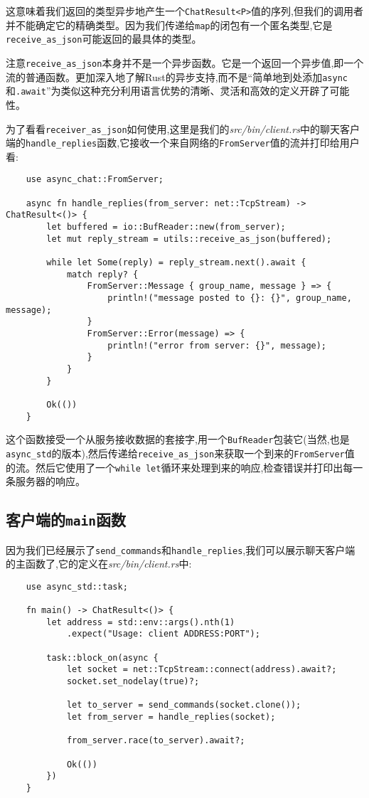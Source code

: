 这意味着我们返回的类型异步地产生一个\texttt{ChatResult<P>}值的序列,但我们的调用者并不能确定它的精确类型。因为我们传递给\texttt{map}的闭包有一个匿名类型,它是\texttt{receive\_as\_json}可能返回的最具体的类型。

注意\texttt{receive\_as\_json}本身并不是一个异步函数。它是一个返回一个异步值,即一个流的普通函数。更加深入地了解Rust的异步支持,而不是“简单地到处添加\texttt{async}和\texttt{.await}”为类似这种充分利用语言优势的清晰、灵活和高效的定义开辟了可能性。 

为了看看\texttt{receiver\_as\_json}如何使用,这里是我们的\emph{src/bin/client.rs}中的聊天客户端的\texttt{handle\_replies}函数,它接收一个来自网络的\texttt{FromServer}值的流并打印给用户看:
\begin{verbatim}
    use async_chat::FromServer;

    async fn handle_replies(from_server: net::TcpStream) -> ChatResult<()> {
        let buffered = io::BufReader::new(from_server);
        let mut reply_stream = utils::receive_as_json(buffered);

        while let Some(reply) = reply_stream.next().await {
            match reply? {
                FromServer::Message { group_name, message } => {
                    println!("message posted to {}: {}", group_name, message);
                }
                FromServer::Error(message) => {
                    println!("error from server: {}", message);
                }
            }
        }

        Ok(())
    }
\end{verbatim}

这个函数接受一个从服务接收数据的套接字,用一个\texttt{BufReader}包装它(当然,也是\texttt{async\_std}的版本),然后传递给\texttt{receive\_as\_json}来获取一个到来的\texttt{FromServer}值的流。然后它使用了一个\texttt{while let}循环来处理到来的响应,检查错误并打印出每一条服务器的响应。

\subsection{客户端的\texttt{main}函数}
因为我们已经展示了\texttt{send\_commands}和\texttt{handle\_replies},我们可以展示聊天客户端的主函数了,它的定义在\emph{src/bin/client.rs}中:
\begin{verbatim}
    use async_std::task;

    fn main() -> ChatResult<()> {
        let address = std::env::args().nth(1)
            .expect("Usage: client ADDRESS:PORT");

        task::block_on(async {
            let socket = net::TcpStream::connect(address).await?;
            socket.set_nodelay(true)?;
            
            let to_server = send_commands(socket.clone());
            let from_server = handle_replies(socket);

            from_server.race(to_server).await?;

            Ok(())
        })
    }
\end{verbatim}


